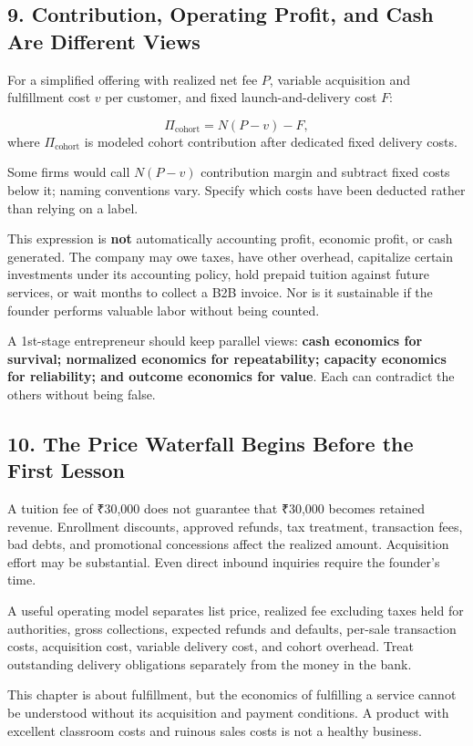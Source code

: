 \subsection*{9. Contribution, Operating Profit, and Cash Are Different Views}

For a simplified offering with realized net fee $P$, variable acquisition and fulfillment cost $v$ per customer, and fixed launch-and-delivery cost $F$:

\begin{equation}
\Pi_{\text{cohort}} = N(P-v) - F,
\end{equation}
where $\Pi_{\text{cohort}}$ is modeled cohort contribution after dedicated fixed delivery costs.

Some firms would call $N(P-v)$ contribution margin and subtract fixed costs below it; naming conventions vary. Specify which costs have been deducted rather than relying on a label.

This expression is \textbf{not} automatically accounting profit, economic profit, or cash generated. The company may owe taxes, have other overhead, capitalize certain investments under its accounting policy, hold prepaid tuition against future services, or wait months to collect a B2B invoice. Nor is it sustainable if the founder performs valuable labor without being counted.

A 1st-stage entrepreneur should keep parallel views: \textbf{cash economics for survival; normalized economics for repeatability; capacity economics for reliability; and outcome economics for value}. Each can contradict the others without being false.

\subsection*{10. The Price Waterfall Begins Before the First Lesson}

A tuition fee of ₹30,000 does not guarantee that ₹30,000 becomes retained revenue. Enrollment discounts, approved refunds, tax treatment, transaction fees, bad debts, and promotional concessions affect the realized amount. Acquisition effort may be substantial. Even direct inbound inquiries require the founder's time.

A useful operating model separates list price, realized fee excluding taxes held for authorities, gross collections, expected refunds and defaults, per-sale transaction costs, acquisition cost, variable delivery cost, and cohort overhead. Treat outstanding delivery obligations separately from the money in the bank.

This chapter is about fulfillment, but the economics of fulfilling a service cannot be understood without its acquisition and payment conditions. A product with excellent classroom costs and ruinous sales costs is not a healthy business.
